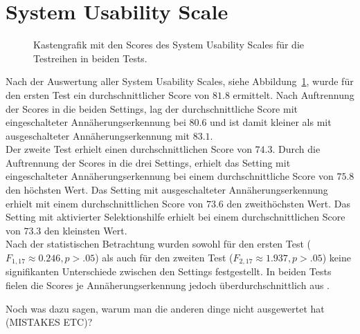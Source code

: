 \documentclass[12pt,numbers=noenddot,parskip,bibliography=totocnumbered,listof=totocnumbered]{scrreprt}
\begin{document}
\section{System Usability Scale}
\begin{figure}
\centering
{}
\hfill
{}
\caption{Kastengrafik mit den Scores des System Usability Scales für die Testreihen in beiden Tests.}
\label{ergebnisSUS}
\end{figure}
Nach der Auswertung aller System Usability Scales, siehe Abbildung~\ref{ergebnisSUS}, wurde für den ersten Test ein durchschnittlicher Score von $81.8$ ermittelt. Nach Auftrennung der Scores in die beiden Settings, lag der durchschnittliche Score mit eingeschalteter Annäherungserkennung bei $80.6$ und ist damit kleiner als mit ausgeschalteter Annäherungserkennung mit $83.1$.\\
Der zweite Test erhielt einen durchschnittlichen Score von $74.3$. Durch die Auftrennung der Scores in die drei Settings, erhielt das Setting mit eingeschalteter Annäherungserkennung bei einem durchschnittliche Score von $75.8$ den höchsten Wert. Das Setting mit ausgeschalteter Annäherungserkennung erhielt mit einem durchschnittlichen Score von $73.6$ den zweithöchsten Wert. Das Setting mit aktivierter Selektionshilfe erhielt bei einem durchschnittlichen Score von $73.3$ den kleinsten Wert.\\
Nach der statistischen Betrachtung wurden sowohl für den ersten Test ($F_{1,17}\approx 0.246, p > .05$) als auch für den zweiten Test ($F_{2,17}\approx 1.937, p > .05$) keine signifikanten Unterschiede zwischen den Settings festgestellt. In beiden Tests fielen die Scores je Annäherungserkennung jedoch überdurchschnittlich aus \citep{sus2013}.

Noch was dazu sagen, warum man die anderen dinge nicht ausgewertet hat (MISTAKES ETC)?
\end{document}
